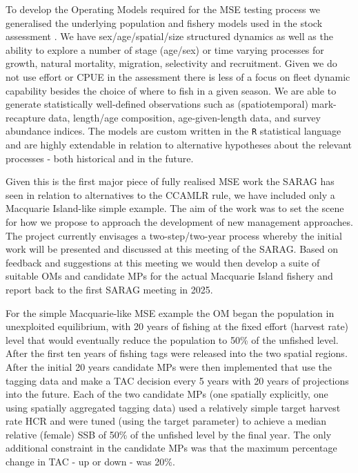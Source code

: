 \documentclass[12pt,a4paper,twoside,times,sky,standard]{csiroreport2017}
\begin{document}
To develop the Operating Models required for the MSE testing process we generalised the underlying population and fishery models used in the stock assessment \cite{misa}. We have sex/age/spatial/size structured dynamics as well as the ability to explore a number of stage (age/sex) or time varying processes for growth, natural mortality, migration, selectivity and recruitment. Given we do not use effort or CPUE in the assessment there is less of a focus on fleet dynamic capability besides the choice of where to fish in a given season. We are able to generate statistically well-defined observations such as (spatiotemporal) mark-recapture data, length/age composition, age-given-length data, and survey abundance indices. The models are custom written in the \texttt{R} statistical language and are highly extendable in relation to alternative hypotheses about the relevant processes - both historical and in the future.

Given this is the first major piece of fully realised MSE work the SARAG has seen in relation to alternatives to the CCAMLR rule, we have included only a Macquarie Island-like simple example. The aim of the work was to set the scene for how we propose to approach the development of new management approaches. The project currently envisages a two-step/two-year process whereby the initial work will be presented and discussed at this meeting of the SARAG. Based on feedback and suggestions at this meeting we would then develop a suite of suitable OMs and candidate MPs for the actual Macquarie Island fishery and report back to the first SARAG meeting in 2025.

For the simple Macquarie-like MSE example the OM began the population in unexploited equilibrium, with 20 years of fishing at the fixed effort (harvest rate) level that would eventually reduce the population to 50\% of the unfished level. After the first ten years of fishing tags were released into the two spatial regions. After the initial 20 years candidate MPs were then implemented that use the tagging data and make a TAC decision every 5 years with 20 years of projections into the future. Each of the two candidate MPs (one spatially explicitly, one using spatially aggregated tagging data) used a relatively simple target harvest rate HCR and were tuned (using the target parameter) to achieve a median relative (female) SSB of 50\% of the unfished level by the final year. The only additional constraint in the candidate MPs was that the maximum percentage change in TAC - up or down - was 20\%.
\end{document}
